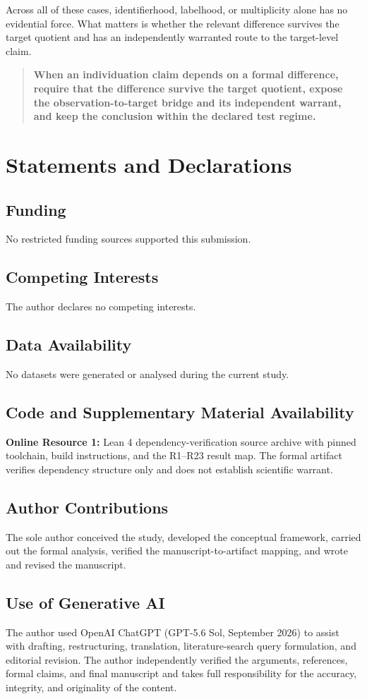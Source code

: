 \documentclass[11pt]{article}
\begin{document}
Across all of these cases, identifierhood, labelhood, or multiplicity alone has no evidential force. What matters is whether the relevant difference survives the target quotient and has an independently warranted route to the target-level claim.

\begin{quote}
\textbf{When an individuation claim depends on a formal difference, require that the difference survive the target quotient, expose the observation-to-target bridge and its independent warrant, and keep the conclusion within the declared test regime.}
\end{quote}

\section*{Statements and Declarations}

\subsection*{Funding}
No restricted funding sources supported this submission.

\subsection*{Competing Interests}
The author declares no competing interests.

\subsection*{Data Availability}
No datasets were generated or analysed during the current study.

\subsection*{Code and Supplementary Material Availability}
\textbf{Online Resource 1:} Lean 4 dependency-verification source archive with pinned toolchain, build instructions, and the R1--R23 result map. The formal artifact verifies dependency structure only and does not establish scientific warrant.

\subsection*{Author Contributions}
The sole author conceived the study, developed the conceptual framework, carried out the formal analysis, verified the manuscript-to-artifact mapping, and wrote and revised the manuscript.

\subsection*{Use of Generative AI}
The author used OpenAI ChatGPT (GPT-5.6 Sol, September 2026) to assist with drafting, restructuring, translation, literature-search query formulation, and editorial revision. The author independently verified the arguments, references, formal claims, and final manuscript and takes full responsibility for the accuracy, integrity, and originality of the content.



\end{document}
